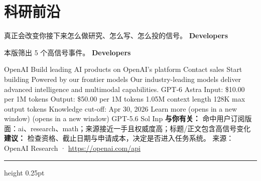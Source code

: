 \documentclass[10.5pt]{ctexart}
\begin{document}
\section*{科研前沿}
{\color{ormuted} 真正会改变你接下来怎么做研究、怎么写、怎么投的信号。}
\vspace{2mm}
{\LARGE\bfseries Developers}\par
\vspace{1mm}
{\color{ormuted} 本版筛出 5 个高信号事件。}
\vspace{3mm}
{\Large\bfseries Developers}\par
OpenAI Build leading AI products on OpenAI’s platform Contact sales Start building Powered by our frontier models Our industry-leading models deliver advanced intelligence and multimodal capabilities. GPT-6 Astra Input: \$10.00 per 1M tokens Output: \$50.00 per 1M tokens 1.05M context length 128K max output tokens Knowledge cut-off: Apr 30, 2026 Learn more (opens in a new window) (opens in a new window) GPT-5.6 Sol Inp
\textbf{与你有关：} 命中用户订阅版面：ai、research、math；来源接近一手且权威度高；标题/正文包含高信号变化
\textbf{建议：} 检查资格、截止日期与申请成本，决定是否进入任务系统。
{\footnotesize\color{ormuted} 来源：OpenAI Research · \url{https://openai.com/api}}
\vspace{4mm}
\hrule height 0.25pt
\vspace{3mm}
\end{document}
